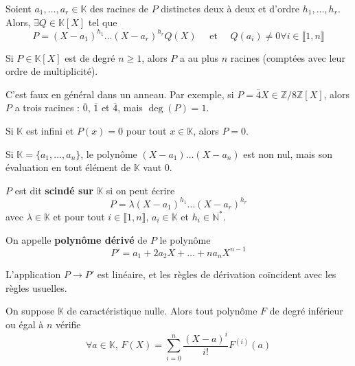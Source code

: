 	\begin{proposition}
		Soient $a_1, \dots, a_r \in \mathbb{K}$ des racines de $P$ distinctes deux à deux et d'ordre $h_1, \dots, h_r$. Alors, $\exists Q \in \mathbb{K}[X]$ tel que
		\[ P = (X-a_1)^{h_1} \dots (X-a_r)^{h_r} Q(X) \quad \text{ et } \quad Q(a_i) \neq 0 \forall i \in \llbracket 1, n \rrbracket \]
	\end{proposition}
	
	\begin{corollary}
		Si $P \in \mathbb{K}[X]$ est de degré $n \geq 1$, alors $P$ a au plus $n$ racines (comptées avec leur ordre de multiplicité).
	\end{corollary}
	
	\begin{cexample}
		C'est faux en général dans un anneau. Par exemple, si $P = \overline{4}X \in \mathbb{Z}/8\mathbb{Z}[X]$, alors $P$ a trois racines : $\overline{0}$, $\overline{1}$ et $\overline{4}$, mais $\deg(P) = 1$.
	\end{cexample}
	
	\begin{proposition}
		Si $\mathbb{K}$ est infini et $P(x) = 0$ pour tout $x \in \mathbb{K}$, alors $P = 0$.
	\end{proposition}
	
	\begin{cexample}
		Si $\mathbb{K} = \{ a_1, \dots, a_n \}$, le polynôme $(X-a_1) \dots (X-a_n)$ est non nul, mais son évaluation en tout élément de $\mathbb{K}$ vaut $0$.
	\end{cexample}
	
	\begin{definition}
		$P$ est dit \textbf{scindé sur $\mathbb{K}$} si on peut écrire
		\[ P = \lambda (X-a_1)^{h_1} \dots (X-a_r)^{h_r} \]
		avec $\lambda \in \mathbb{K}$ et pour tout $i \in \llbracket 1, n \rrbracket$, $a_i \in \mathbb{K}$ et $h_i \in \mathbb{N}^*$.
	\end{definition}
	
	\begin{definition}
		On appelle \textbf{polynôme dérivé} de $P$ le polynôme
		\[ P' = a_1 + 2a_2 X + \dots + na_n X^{n-1} \]
	\end{definition}
	
	\begin{remark}
		L'application $P \rightarrow P'$ est linéaire, et les règles de dérivation coïncident avec les règles usuelles.
	\end{remark}
	
	\begin{theorem}
		On suppose $\mathbb{K}$ de caractéristique nulle. Alors tout polynôme $F$ de degré inférieur ou égal à $n$ vérifie
		\[ \forall a \in \mathbb{K}, \, F(X) = \sum_{i=0}^{n} \frac{(X-a)^i}{i!} F^{(i)}(a) \]
	\end{theorem}
	
